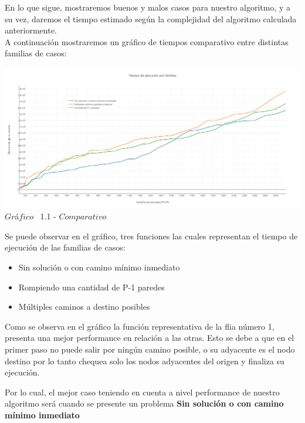 \indent En lo que sigue, mostraremos buenos y malos casos para nuestro algoritmo, y a su vez, daremos el tiempo estimado 
seg\'un la complejidad del algoritmo calculada anteriormente.\\


A continuaci\'on mostraremos un gr\'afico de tiempos comparativo entre distintas familias de casos:\\ 

\vspace*{0.3cm} \vspace*{0.3cm}
  \begin{center}
 \includegraphics[scale=0.4]{./EJ1/comparativo.png}
 {            $Gr$\'a$fico$ \ 1.1 - $Comparativo$}
  \end{center}
  \vspace*{0.3cm}
  
Se puede observar en el gr\'afico, tres funciones las cuales representan el tiempo de ejecuci\'on de las familias de casos:\\
\begin{itemize}
\item Sin soluci\'on o con camino m\'inimo inmediato
\item Rompiendo una cantidad de P-1 paredes
\item M\'ultiples caminos a destino posibles
\end{itemize}


Como se observa en el gr\'afico la funci\'on representativa de la flia n\'umero 1, presenta una mejor performance en relaci\'on a las otras. Esto se debe a que en el primer paso no puede salir por ning\'un camino posible, o su adyacente es el nodo destino por lo tanto chequea solo los nodos adyacentes del origen y finaliza su ejecuci\'on.

Por lo cual, el mejor caso teniendo en cuenta a nivel performance de nuestro algoritmo ser\'a cuando se presente un problema \textbf{Sin soluci\'on o con camino m\'inimo inmediato}

